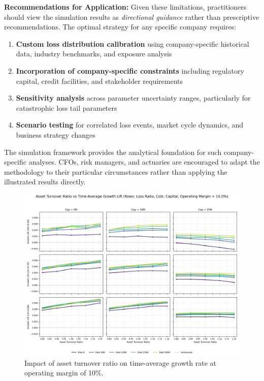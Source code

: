 \documentclass[11pt,letterpaper]{article}
\begin{document}
\vspace{\baselineskip}

\textbf{Recommendations for Application:} Given these limitations, practitioners should view the simulation results as \emph{directional guidance} rather than prescriptive recommendations. The optimal strategy for any specific company requires:
\begin{enumerate}
    \item \textbf{Custom loss distribution calibration} using company-specific historical data, industry benchmarks, and exposure analysis
    \item \textbf{Incorporation of company-specific constraints} including regulatory capital, credit facilities, and stakeholder requirements
    \item \textbf{Sensitivity analysis} across parameter uncertainty ranges, particularly for catastrophic loss tail parameters
    \item \textbf{Scenario testing} for correlated loss events, market cycle dynamics, and business strategy changes
\end{enumerate}

The simulation framework provides the analytical foundation for such company-specific analyses. CFOs, risk managers, and actuaries are encouraged to adapt the methodology to their particular circumstances rather than applying the illustrated results directly.

\begin{figure}[htbp]
    \centering
    \includegraphics[width=1.0\textwidth]{images/option3_multiples_ebit_0.100.png}
    \caption{Impact of asset turnover ratio on time-average growth rate at operating margin of 10\%.}
    \label{fig:multiples_ebit_0.100}
\end{figure}
\end{document}
